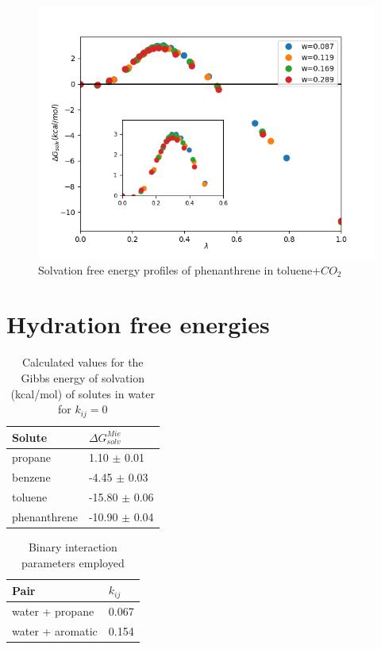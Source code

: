 \begin{figure}[H]
\centering
\includegraphics[width=0.9\linewidth]{Figures/Figure_1}
\caption{Solvation free energy profiles of phenanthrene in toluene+$CO_{2}$}
\label{fig:Figure_1}
\end{figure}


\section{Hydration free energies}

\begin{table}[h]
	\centering
	\caption{Calculated values for the Gibbs energy of solvation (kcal/mol) of solutes in water for $k_{ij}=0$}
	\label{tbl:solv3}
	\begin{tabular}{ll}
		\hline
		Solute & $\Delta G_{solv}^{Mie}$ \\
		\hline
		propane   & 1.10 $\pm$ 0.01   \\
		benzene  & -4.45 $\pm$ 0.03   \\
		toluene  & -15.80 $\pm$ 0.06   \\
		phenanthrene & -10.90 $\pm$ 0.04   \\
		\hline
	\end{tabular}
\end{table}
\begin{table}[h]
  \centering
  \caption{Binary interaction parameters employed}
  \label{tbl:kij}
  \begin{tabular}{ll}
    \hline
      Pair & $k_{ij}$ \\
    \hline
    water  + propane      & 0.067  \\
    water  + aromatic      & 0.154 \\  
    \hline
  \end{tabular}
\end{table}


